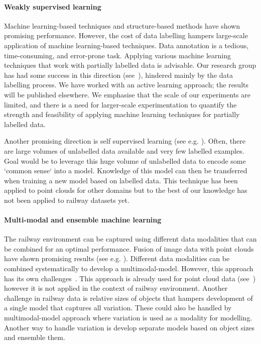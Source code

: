 \paragraph{Weakly supervised learning}
Machine learning-based techniques and st\-ruc\-ture-ba\-sed methods have shown promising performance. However, the cost of data labelling hampers large-scale application of machine learning-based techniques. Data annotation is a tedious, time-consuming, and error-prone task. Applying various machine learning techniques that work with partially labelled data is advisable. Our research group has had some success in this direction (see~\cite{dekker2023semi}), hindered mainly by the data labelling process. We have worked with an active learning approach; the results will be published elsewhere. We emphasise that the scale of our experiments are limited, and there is a need for larger-scale experimentation to quantify the strength and feasibility of applying machine learning techniques for partially labelled data.

Another promising direction is self supervised learning (see e.g. \cite{NEURIPS2019_993edc98}). Often, there are large volumes of unlabelled data available and very few labelled examples. Goal would be to leverage this huge volume of unlabelled data to encode some `common sense` into a model. Knowledge of this model can then be transferred when training a new model based on labelled data. This technique has been applied to point clouds for other domains but to the best of our knowledge has not been applied to railway datasets yet. 

\paragraph{Multi-modal and ensemble machine learning}
The railway environment can be captured using different data modalities that can be combined for an optimal performance. Fusion of image data with point clouds have shown promising results (see e.g. \cite{wang2022farnet,wolf2021asset,mathani2022enhancing}). Different data modalities can be combined systematically to develop a multimodal-model. However, this approach has its own challenges~\cite{baltruvsaitis2018multimodal}. This approach is already used for point cloud data (see~\cite{zhang2022mm}) however it is not applied in the context of railway environment. 
Another challenge in railway data is relative sizes of objects that hampers development of a single model that captures all variation. These could also be handled by multimodal-model approach where variation is used as a modality for modelling. 
Another way to handle variation is develop separate models based on object sizes and ensemble them. 

